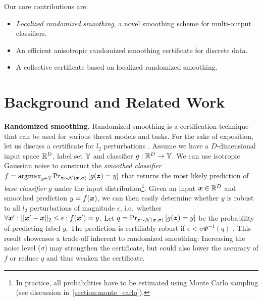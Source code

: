 \documentclass{article} %
\theoremstyle{plain}
\theoremstyle{definition}
\theoremstyle{remark}
\begin{document}
Our core contributions are:
\vspace{-0.9em}
\begin{itemize}%
	\itemsep-0.2em 
	\item \emph{Localized randomized smoothing}, a novel smoothing scheme for multi-output classifiers.
	\item An efficient anisotropic randomized smoothing certificate for discrete data.
	\item A collective certificate
	based on localized randomized smoothing.
\end{itemize}


\section{Background and Related Work}\label{section:background}
\textbf{Randomized smoothing.}\label{section:background_smoothing} Randomized smoothing is a certification technique that can be used for various threat models and tasks. %
For the sake of exposition, let us discuss a certificate for $l_2$ perturbations \citep{Cohen2019}. %
Assume we have a $D$-dimensional input space ${\mathbb{R}}^D$, label set ${\mathbb{Y}}$ and classifier $g : {\mathbb{R}}^D \rightarrow {\mathbb{Y}}$.
We can use isotropic Gaussian noise to construct the \textit{smoothed classifier} 
$f = \mathrm{argmax}_{y \in {\mathbb{Y}}} \Pr_{{\bm{z}} \sim \mathcal{N}({\bm{x}},\sigma)}\left[g({\bm{z}}) = y\right]$ that returns the most likely prediction of \textit{base classifier} $g$ under the input distribution\footnote{In practice, all probabilities have to be estimated using Monte Carlo sampling (see discussion in~\autoref{section:monte_carlo}).}.
Given an input ${\bm{x}} \in {\mathbb{R}}^D$ and smoothed prediction $y = f({\bm{x}})$, we can then easily determine whether $y$ is robust to all $l_2$ perturbations of magnitude $\epsilon$, i.e.~whether $\forall {\bm{x}}' : || {\bm{x}}' - {\bm{x}}||_2 \leq \epsilon : f({\bm{x}}') = y$.
Let $q = \Pr_{{\bm{z}} \sim \mathcal{N}({\bm{x}},\sigma)}\left[g({\bm{z}}) = y\right]$ be the probability  of predicting label $y$.
The prediction is certifiably robust if $\epsilon < \sigma \Phi^{-1}(q)$ \citep{Cohen2019}.
This result showcases a trade-off inherent to randomized smoothing:
Increasing the noise level ($\sigma$) may strengthen the certificate,
but could also lower the accuracy of $f$ or reduce $q$ and thus weaken the certificate.
\end{document}
